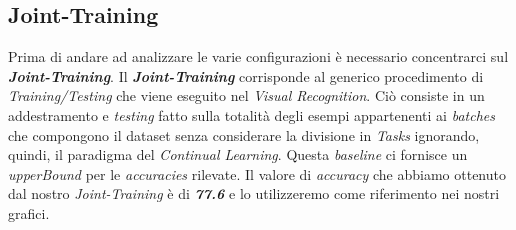 \subsection{Joint-Training}
Prima di andare ad analizzare le varie configurazioni è necessario concentrarci sul \textbf{\textit{Joint-Training}}.
Il \textbf{\textit{Joint-Training}} corrisponde al generico procedimento di \textit{Training/Testing} che viene eseguito nel \textit{Visual Recognition}. Ciò consiste in un addestramento e \textit{testing} fatto sulla totalità degli esempi appartenenti ai \textit{batches} che compongono il dataset senza considerare la divisione in \textit{Tasks} ignorando, quindi, il paradigma del \textit{Continual Learning}. Questa \textit{baseline} ci fornisce un \textit{upperBound} per le \textit{accuracies} rilevate.
Il valore di \textit{accuracy} che abbiamo ottenuto dal nostro \textit{Joint-Training} è di \textit{\textbf{77.6}} e lo utilizzeremo come riferimento nei nostri grafici. 
